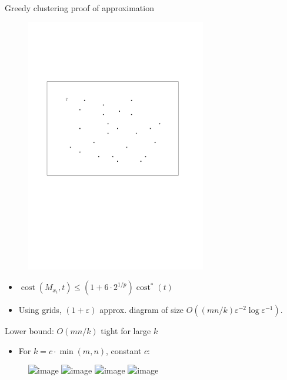 \documentclass[xcolor={dvipsnames,usenames}]{beamer}
\newcommand{\eps}{\varepsilon}
\DeclareMathOperator{\cost}{cost}
\begin{document}
\begin{frame}{Greedy clustering proof of approximation}
\begin{figure}
\begin{center}
\includegraphics[width=0.7\textwidth,page=5]{cluster_proof}%
\end{center}
\end{figure}
\begin{itemize}
\item $\cost(M_{x_i}, t) \leq (1+6\cdot 2^{1/p}) \cost^*(t)$
\item Using grids, $(1+\eps)$ approx. diagram of size
	$O((mn/k) \eps^{-2}\log \eps^{-1})$.
\end{itemize}
\end{frame}

\begin{frame}{Lower bound: $O(mn/k)$ tight for large $k$}
\begin{itemize}
\item For $k = c\cdot\min(m, n)$, constant $c$:
\end{itemize}
\begin{figure}
\begin{center}
\includegraphics<1>[width=0.7\textwidth,page=1]{lower_bound_big_k}%
\includegraphics<2>[width=0.7\textwidth,page=2]{lower_bound_big_k}%
\includegraphics<3>[width=0.7\textwidth,page=3]{lower_bound_big_k}%
\includegraphics<4->[width=0.7\textwidth,page=4]{lower_bound_big_k}%
\end{center}
\end{figure}
\end{frame}
\end{document}
